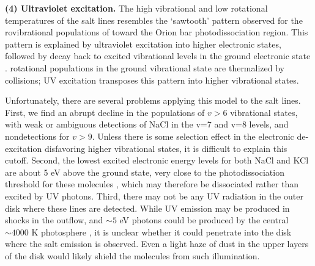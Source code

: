 \documentclass[twocolumn]{aastex62}
\begin{document}
\par{\textbf{(4) Ultraviolet excitation.}}
%
%
The high vibrational and low rotational temperatures of the
salt lines resembles the `sawtooth' pattern observed for the rovibrational
populations of \hh toward the Orion bar photodissociation region.  This
pattern is explained by ultraviolet excitation into higher electronic states,
followed by decay back to excited vibrational levels in the ground electronic
state \citep{Kaplan2017a}.  \hh rotational populations in the ground vibrational
state are thermalized by collisions; UV excitation transposes this pattern into
higher vibrational states.


Unfortunately, there are several problems applying this model to the salt lines.
First, we find an abrupt decline in the populations of $v > 6$ vibrational states,
with weak or ambiguous detections of NaCl in the v=7 and v=8 levels, and
nondetections for $v > 9$.  Unless there is
some selection effect in the electronic de-excitation disfavoring higher vibrational
states, it is difficult to explain this cutoff.  
Second, the lowest excited electronic energy levels for both NaCl and KCl are about
5 eV above the ground state, very close to the photodissociation threshold for these
molecules \citep{Zeiri1983, Silver1986}, which
may therefore be dissociated rather than excited by UV photons.
Third, there may not be any UV radiation in the outer disk where these lines
are detected.  
While UV
emission may be produced in shocks in the outflow, and $\sim5$ eV photons
could be produced by the central $\sim4000$ K photosphere \citep{Testi2010a},
it is unclear whether it could penetrate into the disk where the salt emission
is observed.  Even a light haze of dust in the upper layers of the disk would
likely shield the molecules from such illumination.
\end{document}

